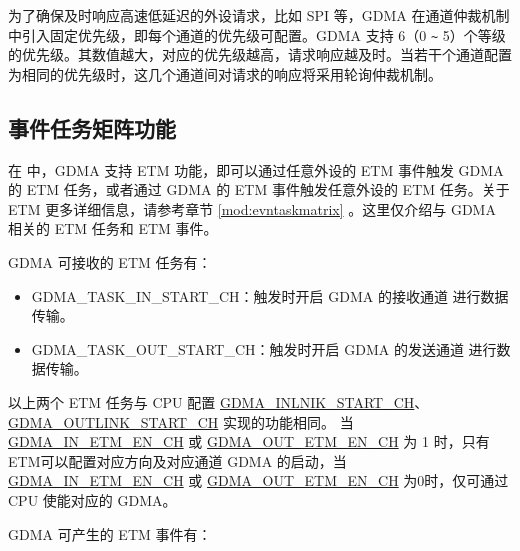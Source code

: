 \documentclass[main\_\_CN.tex]{subfiles}
\begin{document}
为了确保及时响应高速低延迟的外设请求，比如 SPI 等，GDMA 在通道仲裁机制中引入固定优先级，即每个通道的优先级可配置。GDMA 支持 6（0 \verb+~+ 5）个等级的优先级。其数值越大，对应的优先级越高，请求响应越及时。当若干个通道配置为相同的优先级时，这几个通道间对请求的响应将采用轮询仲裁机制。




\subsection{事件任务矩阵功能} \label{sec:dma-etm-func}

在 \chipname{} 中，GDMA 支持 ETM 功能，即可以通过任意外设的 ETM 事件触发 GDMA 的 ETM 任务，或者通过 GDMA 的 ETM 事件触发任意外设的 ETM 任务。关于 ETM 更多详细信息，请参考章节 \ref{mod:evntaskmatrix} 。这里仅介绍与 GDMA 相关的 ETM 任务和 ETM 事件。


GDMA 可接收的 ETM 任务有：

\begin{itemize}
\item GDMA\_TASK\_IN\_START\_CH：触发时开启 GDMA 的接收通道  进行数据传输。
\item GDMA\_TASK\_OUT\_START\_CH：触发时开启 GDMA 的发送通道  进行数据传输。
\end{itemize}

\begin{tiplisting}
以上两个 ETM 任务与 CPU 配置 \hyperref[fielddesc:GDMAINLINKSTARTCHN]{GDMA\_INLNIK\_START\_CH}、\hyperref[fielddesc:GDMAOUTLINKSTARTCHN]{GDMA\_OUTLINK\_START\_CH} 实现的功能相同。 当 \hyperref[fielddesc:GDMAINETMENCHN]{GDMA\_IN\_ETM\_EN\_CH} 或 \hyperref[fielddesc:GDMAOUTETMENCHN]{GDMA\_OUT\_ETM\_EN\_CH} 为 1 时，只有ETM可以配置对应方向及对应通道 GDMA 的启动，当 \hyperref[fielddesc:GDMAINETMENCHN]{GDMA\_IN\_ETM\_EN\_CH} 或 \hyperref[fielddesc:GDMAOUTETMENCHN]{GDMA\_OUT\_ETM\_EN\_CH} 为0时，仅可通过 CPU 使能对应的 GDMA。
\end{tiplisting}

GDMA 可产生的 ETM 事件有：
\end{document}

